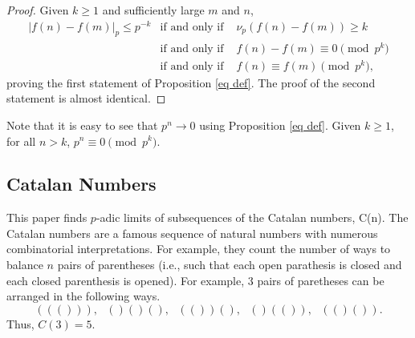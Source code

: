 \documentclass[12pt, letter]{article}    %
\theoremstyle{plain}
\newtheorem{theorem}{Theorem}[section]
\theoremstyle{definition}
\numberwithin{equation}{section}
\newcommand{\Lim}[1]{\raisebox{0.5ex}{\scalebox{0.8}{$\displaystyle \lim_{#1}\;$}}}
\newcommand{\propref}[1]{Proposition \ref{#1}}
\newcommand{\fcite}[1]{[#1]}
\newcommand{\thlabel}[1]{\label{#1}}
\begin{document}
\begin{proof}
Given $k\geq1$ and sufficiently large $m$ and $n$,
\begin{eqnarray*}
\left|f(n)-f(m)\right|_p\leq p^{-k}
&\text{if and only if }& \nu_p(f(n)-f(m))\geq k\\
&\text{if and only if }& f(n)-f(m)\equiv 0\pmod{p^k}\\
&\text{if and only if }& f(n)\equiv f(m)\pmod{p^k},
\end{eqnarray*}
proving the first statement of \propref{eq def}. The proof of the second statement is almost identical.\end{proof}

Note that it is easy to see that $p^n\rightarrow 0$ using \propref{eq def}. Given $k\geq1$, for all $n>k$, $p^n\equiv0\pmod{p^k}$.







\subsection{Catalan Numbers}

This paper finds $p$-adic limits of subsequences of the Catalan numbers, C(n). The Catalan numbers are a famous sequence of natural numbers with numerous combinatorial interpretations. For example, they count the number of ways to balance $n$ pairs of parentheses (i.e., such that each open parathesis is closed and each closed parenthesis is opened). For example, $3$ pairs of paretheses can be arranged in the following ways.
$$((())), \text{ } ()()(), \text{ }  (())(), \text{ }  ()(()),\text{ }   (()()).$$
Thus, $C(3)=5$.
\end{document}

